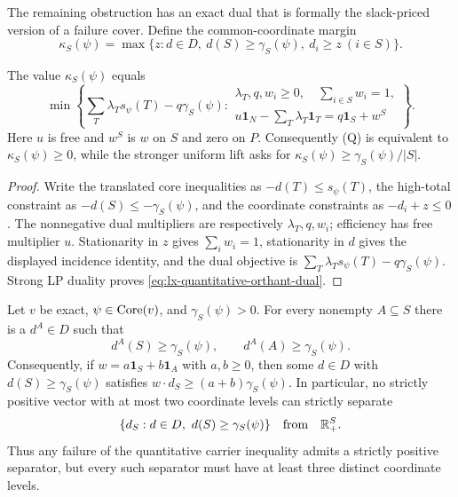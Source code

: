 The remaining obstruction has an exact dual that is formally the slack-priced
version of a failure cover.  Define the common-coordinate margin
\[
 \kappa_S(\psi)=
 \max\{z:d\in D,\ d(S)\geq\gamma_S(\psi),\ d_i\geq z\ (i\in S)\}.
\]

\begin{proposition}
\label{prop:lx-quantitative-orthant-dual}
The value $\kappa_S(\psi)$ equals
\[
 \min\left\{
   \sum_T\lambda_Ts_\psi(T)-q\gamma_S(\psi):
   \begin{array}{l}
   \lambda_T,q,w_i\geq0,\quad \sum_{i\in S}w_i=1,\\
   u\mathbf1_N-\sum_T\lambda_T\mathbf1_T
      =q\mathbf1_S+w^S
   \end{array}
 \right\}.
 \tag{OD}\label{eq:lx-quantitative-orthant-dual}
\]
Here $u$ is free and $w^S$ is $w$ on $S$ and zero on $P$.
Consequently (Q) is equivalent to $\kappa_S(\psi)\geq0$, while the stronger
uniform lift asks for $\kappa_S(\psi)\geq\gamma_S(\psi)/|S|$.
\end{proposition}

\begin{proof}
Write the translated core inequalities as
$-d(T)\leq s_\psi(T)$, the high-total constraint as
$-d(S)\leq-\gamma_S(\psi)$, and the coordinate constraints as
$-d_i+z\leq0$.  The nonnegative dual multipliers are respectively
$\lambda_T,q,w_i$; efficiency has free multiplier $u$.  Stationarity in
$z$ gives $\sum_iw_i=1$, stationarity in $d$ gives the displayed incidence
identity, and the dual objective is
$\sum_T\lambda_Ts_\psi(T)-q\gamma_S(\psi)$.  Strong LP duality proves
\eqref{eq:lx-quantitative-orthant-dual}.
\end{proof}

\begin{proposition}
\label{prop:lx-two-level-orthant-separator}
Let $v$ be exact, $\psi\in\operatorname{Core}(v)$, and $\gamma_S(\psi)>0$.  For every
nonempty $A\subseteq S$ there is a $d^A\in D$ such that
\[
 d^A(S)\geq\gamma_S(\psi),\qquad
 d^A(A)\geq\gamma_S(\psi).
 \tag{OI}\label{eq:lx-indicator-witness}
\]
Consequently, if $w=a\mathbf1_S+b\mathbf1_A$ with $a,b\geq0$, then
some $d\in D$ with $d(S)\geq\gamma_S(\psi)$ satisfies
$w\cdot d_S\geq(a+b)\gamma_S(\psi)$.
In particular, no strictly positive vector with at most two coordinate levels
can strictly separate
\[
 \{d_S:d\in D,\ d(S)\geq\gamma_S(\psi)\}
 \quad\hbox{from}\quad\mathbb R^S_+.
\]
Thus any failure of the quantitative carrier inequality admits a strictly
positive separator, but every such separator must have at least three distinct
coordinate levels.
\end{proposition}


